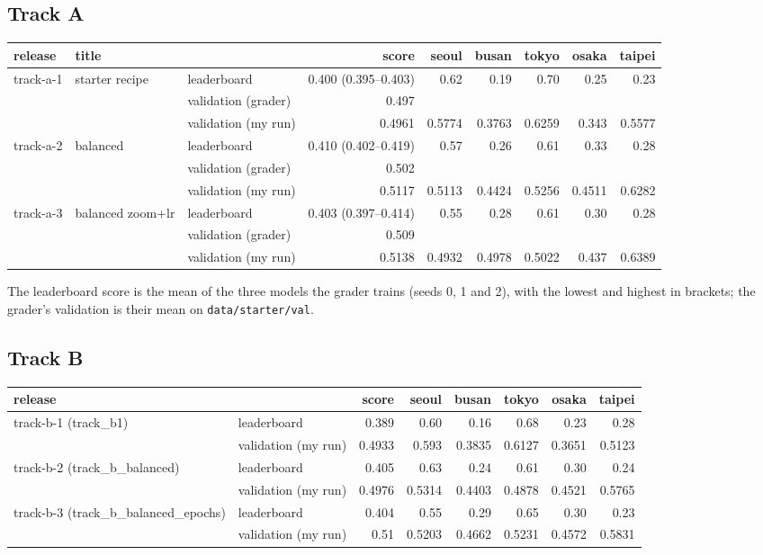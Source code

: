 \documentclass[11pt]{article}
\begin{document}
\subsection*{Track A}
\begin{center}\footnotesize
\begin{tabular}{lllrrrrrr}
\toprule
release & title & & score & seoul & busan & tokyo & osaka & taipei \\
\midrule
track-a-1 & starter recipe & leaderboard & 0.400 (0.395--0.403) & 0.62 & 0.19 & 0.70 & 0.25 & 0.23 \\
 & & validation (grader) & 0.497 & & & & & \\
 & & validation (my run) & 0.4961 & 0.5774 & 0.3763 & 0.6259 & 0.343 & 0.5577 \\
track-a-2 & balanced & leaderboard & 0.410 (0.402--0.419) & 0.57 & 0.26 & 0.61 & 0.33 & 0.28 \\
 & & validation (grader) & 0.502 & & & & & \\
 & & validation (my run) & 0.5117 & 0.5113 & 0.4424 & 0.5256 & 0.4511 & 0.6282 \\
track-a-3 & balanced zoom+lr & leaderboard & 0.403 (0.397--0.414) & 0.55 & 0.28 & 0.61 & 0.30 & 0.28 \\
 & & validation (grader) & 0.509 & & & & & \\
 & & validation (my run) & 0.5138 & 0.4932 & 0.4978 & 0.5022 & 0.437 & 0.6389 \\
\bottomrule
\end{tabular}
\end{center}
The leaderboard score is the mean of the three models the grader trains (seeds 0, 1 and 2), with the lowest and highest in brackets; the grader's validation is their mean on \texttt{data/starter/val}.

\subsection*{Track B}
\begin{center}\footnotesize
\begin{tabular}{llrrrrrr}
\toprule
release & & score & seoul & busan & tokyo & osaka & taipei \\
\midrule
track-b-1 (track\_b1) & leaderboard & 0.389 & 0.60 & 0.16 & 0.68 & 0.23 & 0.28 \\
 & validation (my run) & 0.4933 & 0.593 & 0.3835 & 0.6127 & 0.3651 & 0.5123 \\
track-b-2 (track\_b\_balanced) & leaderboard & 0.405 & 0.63 & 0.24 & 0.61 & 0.30 & 0.24 \\
 & validation (my run) & 0.4976 & 0.5314 & 0.4403 & 0.4878 & 0.4521 & 0.5765 \\
track-b-3 (track\_b\_balanced\_epochs) & leaderboard & 0.404 & 0.55 & 0.29 & 0.65 & 0.30 & 0.23 \\
 & validation (my run) & 0.51 & 0.5203 & 0.4662 & 0.5231 & 0.4572 & 0.5831 \\
\bottomrule
\end{tabular}
\end{center}
\end{document}
